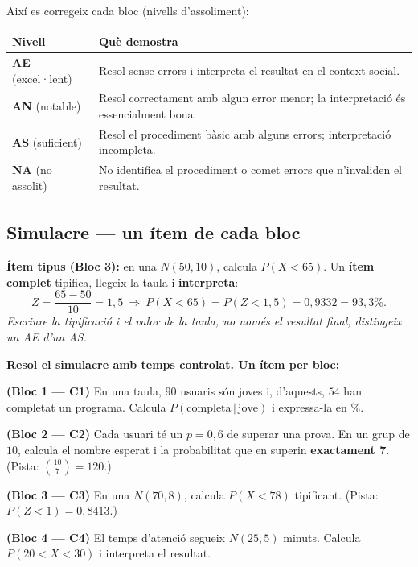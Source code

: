 \noindent Així es corregeix cada bloc (nivells d'assoliment):
\begin{center}
\renewcommand{\arraystretch}{1.3}
\begin{tabular}{p{2.4cm} p{10.2cm}}
\toprule
\textbf{Nivell} & \textbf{Què demostra} \\
\midrule
\textbf{AE} (excel·lent) & Resol sense errors i interpreta el resultat en el context
social. \\
\textbf{AN} (notable) & Resol correctament amb algun error menor; la interpretació és
essencialment bona. \\
\textbf{AS} (suficient) & Resol el procediment bàsic amb alguns errors; interpretació
incompleta. \\
\textbf{NA} (no assolit) & No identifica el procediment o comet errors que
n'invaliden el resultat. \\
\bottomrule
\end{tabular}
\end{center}

\subsection{Simulacre — un ítem de cada bloc}

\begin{exemple}
\textbf{Ítem tipus (Bloc 3):} en una $N(50,10)$, calcula $P(X<65)$. Un \textbf{ítem
complet} tipifica, llegeix la taula i \textbf{interpreta}:
\[
Z=\frac{65-50}{10}=1,5\ \Rightarrow\ P(X<65)=P(Z<1,5)=0,9332=93,3\%.
\]
\emph{Escriure la tipificació i el valor de la taula, no només el resultat final,
distingeix un AE d'un AS.}
\end{exemple}

\begin{exercicis}
\textbf{Resol el simulacre amb temps controlat. Un ítem per bloc:}
\begin{exlist}
  \item \textbf{(Bloc 1 — C1)} En una taula, $90$ usuaris són joves i, d'aquests, $54$ han
        completat un programa. Calcula $P(\text{completa}\,|\,\text{jove})$ i expressa-la
        en \%.
  \item \textbf{(Bloc 2 — C2)} Cada usuari té un $p=0,6$ de superar una prova. En un grup
        de $10$, calcula el nombre esperat i la probabilitat que en superin
        \textbf{exactament 7}. (Pista: $\binom{10}{7}=120$.)
  \item \textbf{(Bloc 3 — C3)} En una $N(70,8)$, calcula $P(X<78)$ tipificant. (Pista:
        $P(Z<1)=0,8413$.)
  \item \textbf{(Bloc 4 — C4)} El temps d'atenció segueix $N(25,5)$ minuts. Calcula
        $P(20<X<30)$ i interpreta el resultat.
\end{exlist}
\end{exercicis}

